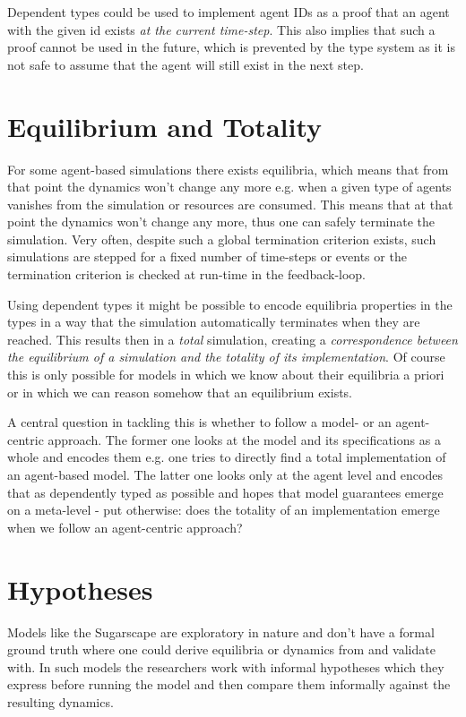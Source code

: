 Dependent types could be used to implement agent IDs as a proof that an agent with the given id exists \textit{at the current time-step}. This also implies that such a proof cannot be used in the future, which is prevented by the type system as it is not safe to assume that the agent will still exist in the next step. %
\\

\section{Equilibrium and Totality}
For some agent-based simulations there exists equilibria, which means that from that point the dynamics won't change any more e.g. when a given type of agents vanishes from the simulation or resources are consumed. This means that at that point the dynamics won't change any more, thus one can safely terminate the simulation. Very often, despite such a global termination criterion exists, such simulations are stepped for a fixed number of time-steps or events or the termination criterion is checked at run-time in the feedback-loop. 
	
Using dependent types it might be possible to encode equilibria properties in the types in a way that the simulation automatically terminates when they are reached. This results then in a \textit{total} simulation, creating a \textit{correspondence between the equilibrium of a simulation and the totality of its implementation}. Of course this is only possible for models in which we know about their equilibria a priori or in which we can reason somehow that an equilibrium exists.

A central question in tackling this is whether to follow a model- or an agent-centric approach. The former one looks at the model and its specifications as a whole and encodes them e.g. one tries to directly find a total implementation of an agent-based model. The latter one looks only at the agent level and encodes that as dependently typed as possible and hopes that model guarantees emerge on a meta-level - put otherwise: does the totality of an implementation emerge when we follow an agent-centric approach?

\section{Hypotheses}
Models like the Sugarscape are exploratory in nature and don't have a formal ground truth where one could derive equilibria or dynamics from and validate with. In such models the researchers work with informal hypotheses which they express before running the model and then compare them informally against the resulting dynamics.

